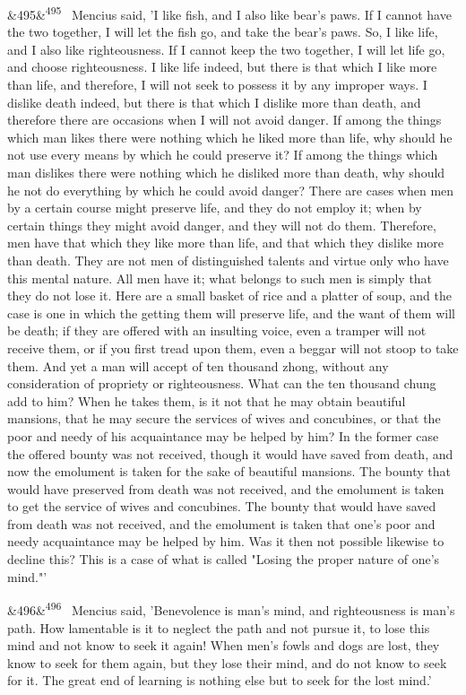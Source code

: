 \documentclass[12pt]{article}
\newcommand{\para}[1][]{\par\noindent\ifx&#1&\else\textsuperscript{\footnotesize #1}~\fi}
\begin{document}
\para[495] Mencius said, 'I like fish, and I also like bear's paws. If I cannot have the two together, I will let the fish go, and take the bear's paws. So, I like life, and I also like righteousness. If I cannot keep the two together, I will let life go, and choose righteousness. I like life indeed, but there is that which I like more than life, and therefore, I will not seek to possess it by any improper ways. I dislike death indeed, but there is that which I dislike more than death, and therefore there are occasions when I will not avoid danger. If among the things which man likes there were nothing which he liked more than life, why should he not use every means by which he could preserve it? If among the things which man dislikes there were nothing which he disliked more than death, why should he not do everything by which he could avoid danger? There are cases when men by a certain course might preserve life, and they do not employ it; when by certain things they might avoid danger, and they will not do them. Therefore, men have that which they like more than life, and that which they dislike more than death. They are not men of distinguished talents and virtue only who have this mental nature. All men have it; what belongs to such men is simply that they do not lose it. Here are a small basket of rice and a platter of soup, and the case is one in which the getting them will preserve life, and the want of them will be death; if they are offered with an insulting voice, even a tramper will not receive them, or if you first tread upon them, even a beggar will not stoop to take them. And yet a man will accept of ten thousand zhong, without any consideration of propriety or righteousness. What can the ten thousand chung add to him? When he takes them, is it not that he may obtain beautiful mansions, that he may secure the services of wives and concubines, or that the poor and needy of his acquaintance may be helped by him? In the former case the offered bounty was not received, though it would have saved from death, and now the emolument is taken for the sake of beautiful mansions. The bounty that would have preserved from death was not received, and the emolument is taken to get the service of wives and concubines. The bounty that would have saved from death was not received, and the emolument is taken that one's poor and needy acquaintance may be helped by him. Was it then not possible likewise to decline this? This is a case of what is called "Losing the proper nature of one's mind."'

\para[496] Mencius said, 'Benevolence is man's mind, and righteousness is man's path. How lamentable is it to neglect the path and not pursue it, to lose this mind and not know to seek it again! When men's fowls and dogs are lost, they know to seek for them again, but they lose their mind, and do not know to seek for it. The great end of learning is nothing else but to seek for the lost mind.'
\end{document}
